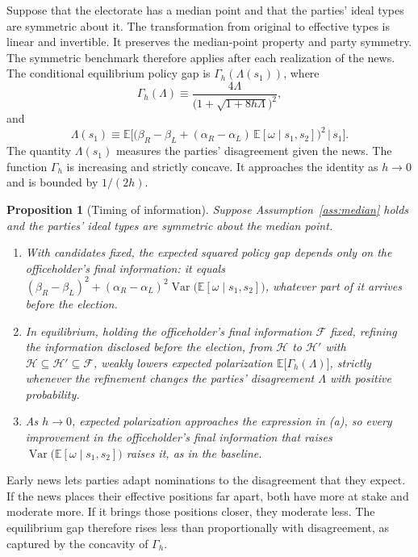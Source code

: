 \documentclass[12pt,letterpaper]{article}
\newtheorem{proposition}{Proposition}
\begin{document}
Suppose that the electorate has a median point and that the parties' ideal types are symmetric about it. The transformation from original to effective types is linear and invertible. It preserves the median-point property and party symmetry. The symmetric benchmark therefore applies after each realization of the news. The conditional equilibrium policy gap is $\Gamma_h(\Lambda(s_1))$, where
\[
\Gamma_h(\Lambda)\equiv\frac{4\Lambda}{\big(1+\sqrt{1+8h\Lambda}\big)^2},
\]
and
\[
\Lambda(s_1)\equiv\mathbb{E}\Big[\big(\beta_R-\beta_L+(\alpha_R-\alpha_L)\,\mathbb{E}[\omega\mid s_1,s_2]\big)^2\,\Big|\,s_1\Big].
\]
The quantity $\Lambda(s_1)$ measures the parties' disagreement given the news. The function $\Gamma_h$ is increasing and strictly concave. It approaches the identity as $h\to0$ and is bounded by $1/(2h)$.

\begin{proposition}[Timing of information]\label{prop:timing}
Suppose Assumption~\ref{ass:median} holds and the parties' ideal types are symmetric about the median point.
\begin{enumerate}
  \item[(a)] With candidates fixed, the expected squared policy gap depends only on the officeholder's final information: it equals $(\beta_R-\beta_L)^2+(\alpha_R-\alpha_L)^2\operatorname{Var}\big(\mathbb{E}[\omega\mid s_1,s_2]\big)$, whatever part of it arrives before the election.
  \item[(b)] In equilibrium, holding the officeholder's final information $\mathcal F$ fixed, refining the information disclosed before the election, from $\mathcal H$ to $\mathcal H'$ with $\mathcal H\subseteq\mathcal H'\subseteq\mathcal F$, weakly lowers expected polarization $\mathbb{E}\big[\Gamma_h(\Lambda)\big]$, strictly whenever the refinement changes the parties' disagreement $\Lambda$ with positive probability.
  \item[(c)] As $h\to0$, expected polarization approaches the expression in (a), so every improvement in the officeholder's final information that raises $\operatorname{Var}\big(\mathbb{E}[\omega\mid s_1,s_2]\big)$ raises it, as in the baseline.
\end{enumerate}
\end{proposition}

Early news lets parties adapt nominations to the disagreement that they expect. If the news places their effective positions far apart, both have more at stake and moderate more. If it brings those positions closer, they moderate less. The equilibrium gap therefore rises less than proportionally with disagreement, as captured by the concavity of $\Gamma_h$.
\end{document}
